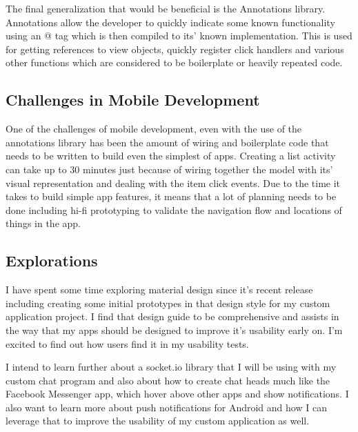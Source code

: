 \documentclass[11pt,english,numbers=endperiod,parskip=half]{scrartcl}
\begin{document}
    The final generalization that would be beneficial is the Annotations library.
    Annotations allow the developer to quickly indicate some known functionality
    using an @ tag which is then compiled to its' known implementation. This is
    used for getting references to view objects, quickly register click handlers
    and various other functions which are considered to be boilerplate or
    heavily repeated code.

  \subsection{Challenges in Mobile Development}
    One of the challenges of mobile development, even with the use of the
    annotations library has been the amount of wiring and boilerplate code that
    needs to be written to build even the simplest of apps. Creating a list
    activity can take up to 30 minutes just because of wiring together the model
    with its' visual representation and dealing with the item click events.
    Due to the time it takes to build simple app features, it means that a lot
    of planning needs to be done including hi-fi prototyping to validate the
    navigation flow and locations of things in the app.

  \subsection{Explorations}
    I have spent some time exploring material design since it's recent release
    including creating some initial prototypes in that design style for my
    custom application project. I find that design guide to be comprehensive
    and assists in the way that my apps should be designed to improve it's
    usability early on. I'm excited to find out how users find it in my
    usability tests.

    I intend to learn further about a socket.io library that I will be using
    with my custom chat program and also about how to create chat heads
    much like the Facebook Messenger app, which hover above other apps and show
    notifications. I also want to learn more about push notifications for
    Android and how I can leverage that to improve the usability of my custom
    application as well.
\end{document}
